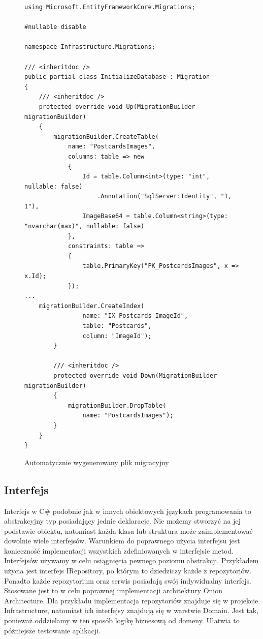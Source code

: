 \documentclass[a4paper,twoside,12pt]{book}
\begin{document}
\begin{figure}[H]
    \begin{lstlisting}
using Microsoft.EntityFrameworkCore.Migrations;

#nullable disable

namespace Infrastructure.Migrations;

/// <inheritdoc />
public partial class InitializeDatabase : Migration
{
    /// <inheritdoc />
    protected override void Up(MigrationBuilder migrationBuilder)
    {
        migrationBuilder.CreateTable(
            name: "PostcardsImages",
            columns: table => new
            {
                Id = table.Column<int>(type: "int", nullable: false)
                    .Annotation("SqlServer:Identity", "1, 1"),
                ImageBase64 = table.Column<string>(type: "nvarchar(max)", nullable: false)
            },
            constraints: table =>
            {
                table.PrimaryKey("PK_PostcardsImages", x => x.Id);
            });
...
    migrationBuilder.CreateIndex(
                name: "IX_Postcards_ImageId",
                table: "Postcards",
                column: "ImageId");
        }

        /// <inheritdoc />
        protected override void Down(MigrationBuilder migrationBuilder)
        {
            migrationBuilder.DropTable(
                name: "PostcardsImages");
        }
    }
}
    \end{lstlisting}
\caption{Automatycznie wygenerowany plik migracyjny}
\label{fig:pseudokod:listings}
\end{figure}

\subsection{Interfejs}
Interfejs w C\# podobnie jak w innych obiektowych językach programowania to abstrakcyjny typ posiadający jednie deklaracje. Nie możemy stworzyć na jej podstawie obiektu, natomiast każda klasa lub struktura może zaimplementować dowolnie wiele interfejsów. Warunkiem do poprawnego użycia interfejsu jest konieczność implementacji wszystkich zdefiniowanych w interfejsie metod. Interfejsów używamy w celu osiągnięcia pewnego poziomu abstrakcji. Przykładem użycia jest interfejs IRepository, po którym to dziedziczy każde z repozytoriów. Ponadto każde repozytorium oraz serwis posiadają swój indywidualny interfejs. Stosowane jest to w celu poprawnej implementacji architektury Onion Architecture. Dla przykładu implementacja repozytoriów znajduje się w projekcie Infrastructure, natomiast ich interfejsy znajdują się w warstwie Domain. Jest tak, ponieważ oddzielamy w ten sposób logikę biznesową od domeny. Ułatwia to późniejsze testowanie aplikacji. 
\end{document}
